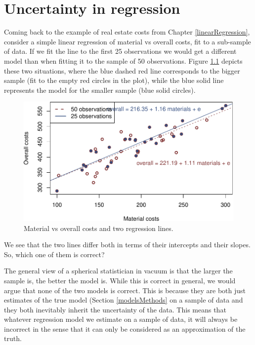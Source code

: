 \documentclass[
]{book}
\theoremstyle{definition}
\theoremstyle{definition}
\theoremstyle{definition}
\theoremstyle{definition}
\theoremstyle{remark}
\begin{document}
\chapter{Uncertainty in regression}\label{uncertaintyRegression}

Coming back to the example of real estate costs from Chapter \ref{linearRegression}, consider a simple linear regression of material vs overall costs, fit to a sub-sample of data. If we fit the line to the first 25 observations we would get a different model than when fitting it to the sample of 50 observations. Figure \ref{fig:scatterCostsUncertainty} depicts these two situations, where the blue dashed red line corresponds to the bigger sample (fit to the empty red circles in the plot), while the blue solid line represents the model for the smaller sample (blue solid circles).

\begin{figure}
\centering
\includegraphics{Svetunkov---Statistics-for-Business-Analytics_files/figure-latex/scatterCostsUncertainty-1.pdf}
\caption{\label{fig:scatterCostsUncertainty}Material vs overall costs and two regression lines.}
\end{figure}

We see that the two lines differ both in terms of their intercepts and their slopes. So, which one of them is correct?

The general view of a spherical statistician in vacuum is that the larger the sample is, the better the model is. While this is correct in general, we would argue that none of the two models is correct. This is because they are both just estimates of the true model (Section \ref{modelsMethods} on a sample of data and they both inevitably inherit the uncertainty of the data. This means that whatever regression model we estimate on a sample of data, it will always be incorrect in the sense that it can only be considered as an approximation of the truth.
\end{document}

